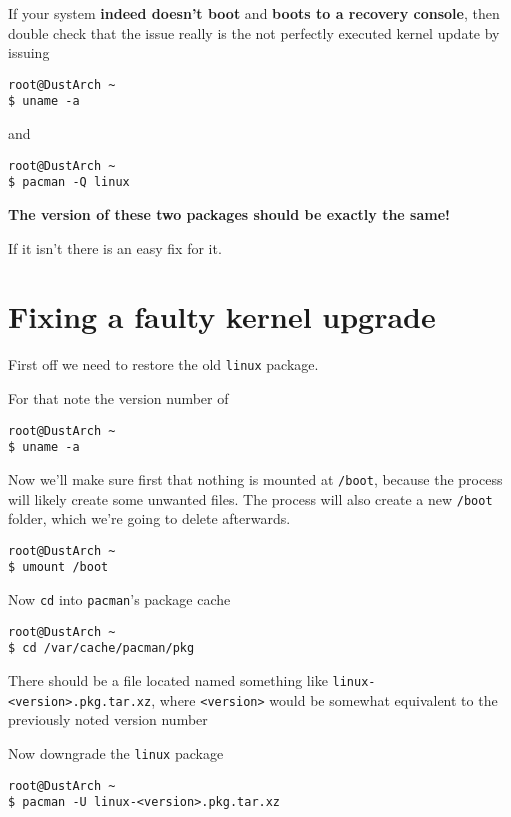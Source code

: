 \documentclass[9pt]{report}
\begin{document}
If your system \textbf{indeed doesn’t boot} and \textbf{boots to a recovery console}, then double check that the issue really is the not perfectly executed kernel update by issuing


\begin{verbatim}
root@DustArch ~
$ uname -a
\end{verbatim}

and


\begin{verbatim}
root@DustArch ~
$ pacman -Q linux
\end{verbatim}

\textbf{The version of these two packages should be exactly the same!}

If it isn’t there is an easy fix for it.

\newpage

\hypertarget{x-fixing-a-faulty-kernel-upgrade}{\section{Fixing a faulty kernel upgrade}}
First off we need to restore the old \texttt{linux} package.


For that note the version number of


\begin{verbatim}
root@DustArch ~
$ uname -a
\end{verbatim}

Now we’ll make sure first that nothing is mounted at \texttt{/boot}, because the process will likely create some unwanted files.
The process will also create a new \texttt{/boot} folder, which we’re going to delete afterwards.


\begin{verbatim}
root@DustArch ~
$ umount /boot
\end{verbatim}

Now \texttt{cd} into \texttt{pacman}'s package cache


\begin{verbatim}
root@DustArch ~
$ cd /var/cache/pacman/pkg
\end{verbatim}

There should be a file located named something like \texttt{linux-<version>.pkg.tar.xz}, where \texttt{<version>} would be somewhat equivalent to the previously noted version number


Now downgrade the \texttt{linux} package


\begin{verbatim}
root@DustArch ~
$ pacman -U linux-<version>.pkg.tar.xz
\end{verbatim}
\end{document}
